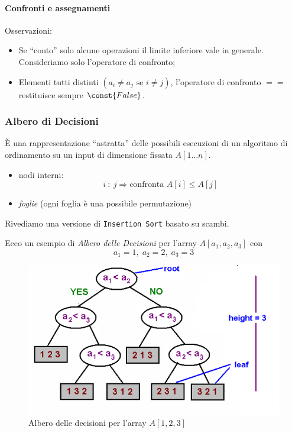 \paragraph{Confronti e assegnamenti} 

Osservazioni:
\begin{itemize}[label=$\rightarrow$]
    \item Se ``conto'' solo alcune operazioni il limite inferiore
    vale in generale. Consideriamo solo l'operatore di confronto;
    \item Elementi tutti distinti $(a_i \neq a_j \text{ se } i \neq j)$,
    l'operatore di confronto $==$ restituisce sempre $\const{False}$.
\end{itemize}

\subsubsection{Albero di Decisioni}

È una rappresentazione ``astratta'' delle possibili esecuzioni di un 
algoritmo di ordinamento su un input di dimensione fissata $A[1 \dots n]$.

\begin{itemize}[label=$\rightarrow$]
    \item nodi interni: 
    $$i \ : \ j \Rightarrow \text{confronta } A[i] \leq A[j]$$
    \item \emph{foglie} (ogni foglia è una possibile permutazione)
\end{itemize}

Rivediamo una versione di \texttt{Insertion Sort} basato su scambi.

\clearpage
Ecco un esempio di \emph{Albero delle Decisioni} per l'array $A[a_1,a_2,a_3]$ 
con 
$$a_1 = 1, \; a_2 = 2, \; a_3 = 3$$
\begin{figure}[!hb] 
    \centering
    \includegraphics[width=\textwidth]{img/decision-tree.png}
    \caption{Albero delle decisioni per l'array $A[1,2,3]$}
\end{figure}

